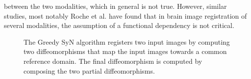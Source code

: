 between the two modalities, which in general is not true. However, similar studies, most notably Roche et al. \cite{Roche1998} have found that in brain image registration of several
modalities, the assumption of a functional dependency is not critical.

\begin{figure}[H]
\centering
{}
\caption{The Greedy SyN algorithm registers two input images by computing two diffeomorphisms that map the input images towards a common reference domain. The final
diffeomorphism is computed by composing the two partial diffeomorphisms.}
\label{fig:syn_overview}
\end{figure}

